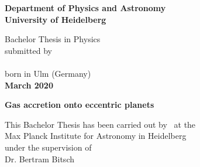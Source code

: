 
\begin{titlepage}
  \begin{center}
     
    \Large\textbf{
      Department of Physics and Astronomy\\
      University of Heidelberg
    }
    
    \vspace{18cm}
    
    \normalsize
    Bachelor Thesis in Physics\\
    submitted by\\
    \vspace{0.5cm}
    \Large\textbf{\theauthor}\\
    \normalsize
    \vspace{0.5cm}
    born in Ulm (Germany)\\
    \vspace{0.5cm}
    \Large\textbf{March 2020}
    \normalsize
    
    \newpage\null\thispagestyle{empty}\newpage
    
    \Large\textbf{
      Gas accretion onto eccentric planets
    }
    
    \vspace{18cm}
    
    \normalsize
    This Bachelor Thesis has been carried out by \theauthor\ at the\\
    Max Planck Institute for Astronomy in Heidelberg\\
    under the supervision of\\
    Dr. Bertram Bitsch
    
    \vfill
  \end{center}

\end{titlepage}

